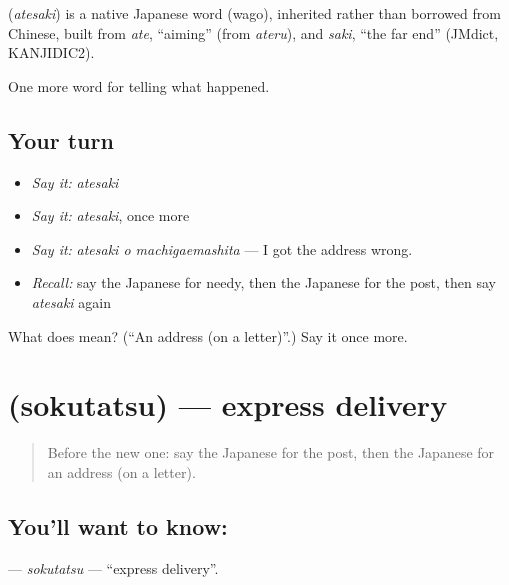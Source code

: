 \begin{cousinweb}
\textbf{} (\emph{atesaki}) is a native Japanese word (wago), inherited rather than borrowed from Chinese, built from \emph{ate}, \textquotedblleft{}aiming\textquotedblright{} (from \emph{ateru}), and \emph{saki}, \textquotedblleft{}the far end\textquotedblright{} (JMdict, KANJIDIC2).
\end{cousinweb}

\begin{grammarlens}[title={What you've built}]
One more word for telling what happened.
\end{grammarlens}

\subsection*{Your turn}
\begin{itemize}
\raggedright
  \item \emph{Say it:} \emph{atesaki}
  \item \emph{Say it:} \emph{atesaki}, once more
  \item \emph{Say it:} \emph{atesaki o machigaemashita} — I got the address wrong.
  \item \emph{Recall:} say the Japanese for needy, then the Japanese for the post, then say \emph{atesaki} again
\end{itemize}

\begin{tcolorbox}[breakable,colback=teal!4,colframe=teal!35!black,title={Before you move on}]
What does  mean? (\textquotedblleft{}An address (on a letter)\textquotedblright{}.) Say it once more.
\end{tcolorbox}
\section[\texorpdfstring{\ja{そくたつ} (sokutatsu)}{そくたつ (sokutatsu)}]{ (sokutatsu) — express delivery}

\label{lesson:JA-C305-sokutatsu}



\begin{quote}
Before the new one: say the Japanese for the post, then the Japanese for an address (on a letter).
\end{quote}

\subsection*{You'll want to know: }
\textbf{} — \emph{sokutatsu} — \textquotedblleft{}express delivery\textquotedblright{}.

